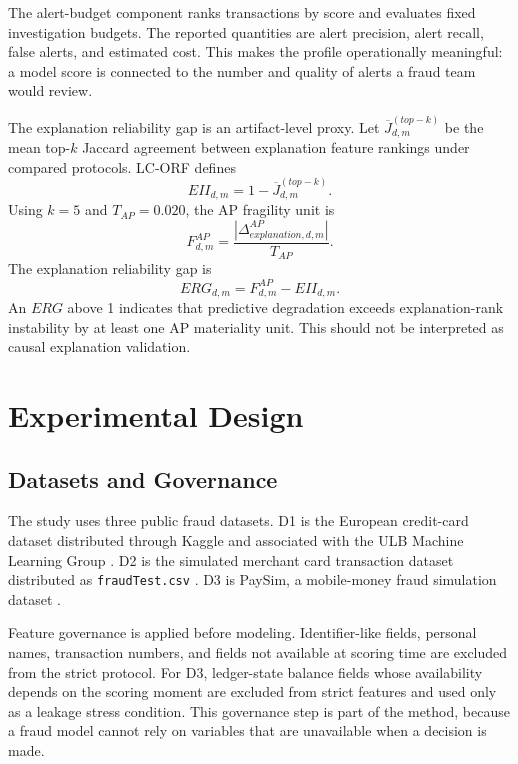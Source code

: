 \documentclass{ieeeaccess}
\begin{document}
The alert-budget component ranks transactions by score and evaluates fixed investigation budgets. The reported quantities are alert precision, alert recall, false alerts, and estimated cost. This makes the profile operationally meaningful: a model score is connected to the number and quality of alerts a fraud team would review.

The explanation reliability gap is an artifact-level proxy. Let $\overline{J}^{(top-k)}_{d,m}$ be the mean top-$k$ Jaccard agreement between explanation feature rankings under compared protocols. LC-ORF defines
\begin{equation}
EII_{d,m}=1-\overline{J}^{(top-k)}_{d,m}.
\end{equation}
Using $k=5$ and $T_{AP}=0.020$, the AP fragility unit is
\begin{equation}
F^{AP}_{d,m}
= \frac{|\Delta^{AP}_{explanation,d,m}|}{T_{AP}}.
\end{equation}
The explanation reliability gap is
\begin{equation}
ERG_{d,m}=F^{AP}_{d,m}-EII_{d,m}.
\label{eq:erg}
\end{equation}
An $ERG$ above 1 indicates that predictive degradation exceeds explanation-rank instability by at least one AP materiality unit. This should not be interpreted as causal explanation validation.

\FloatBarrier
\section{Experimental Design}
\label{sec:design}
\subsection{Datasets and Governance}
The study uses three public fraud datasets. D1 is the European credit-card dataset distributed through Kaggle and associated with the ULB Machine Learning Group \cite{creditcard_kaggle}. D2 is the simulated merchant card transaction dataset distributed as \texttt{fraudTest.csv} \cite{fraudtest_kaggle}. D3 is PaySim, a mobile-money fraud simulation dataset \cite{lopezrojas2016paysim}.

Feature governance is applied before modeling. Identifier-like fields, personal names, transaction numbers, and fields not available at scoring time are excluded from the strict protocol. For D3, ledger-state balance fields whose availability depends on the scoring moment are excluded from strict features and used only as a leakage stress condition. This governance step is part of the method, because a fraud model cannot rely on variables that are unavailable when a decision is made.
\end{document}
